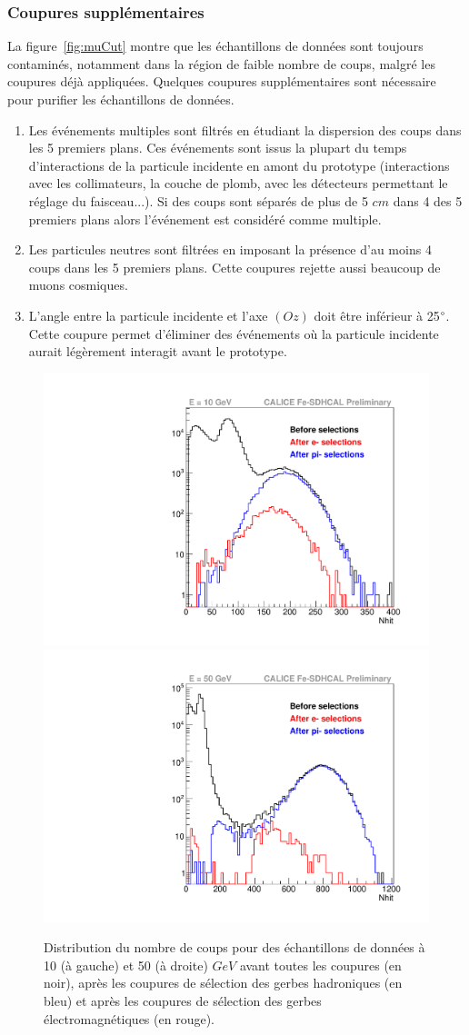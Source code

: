 \subsubsection{Coupures supplémentaires}
La figure~\ref{fig:muCut} montre que les échantillons de données sont toujours contaminés, notamment dans la région de faible nombre de coups, malgré les coupures déjà appliquées. Quelques coupures supplémentaires sont nécessaire pour purifier les échantillons de données. 
\begin{enumerate}[-]
\item Les événements multiples sont filtrés en étudiant la dispersion des coups dans les 5 premiers plans. Ces événements sont issus la plupart du temps d’interactions de la particule incidente en amont du prototype (interactions avec les collimateurs, la couche de plomb, avec les détecteurs permettant le réglage du faisceau...). Si des coups sont séparés de plus de 5 $cm$ dans 4 des 5 premiers plans alors l'événement est considéré comme multiple. 
\item Les particules neutres sont filtrées en imposant la présence d'au moins 4 coups dans les 5 premiers plans. Cette coupures rejette aussi beaucoup de muons cosmiques.
\item L'angle entre la particule incidente et l'axe $(Oz)$ doit être inférieur à 25$\degree$. Cette coupure permet d'éliminer des événements où la particule incidente aurait légèrement interagit avant le prototype.
\end{enumerate}
\label{sec.shower_selection}
\begin{figure}[!h]
  \begin{center}
    \includegraphics[width=.45\textwidth]{SDHCAL/figs/selection715693.pdf}
    \includegraphics[width=.45\textwidth]{SDHCAL/figs/selection715751.pdf}
    \caption{Distribution du nombre de coups pour des échantillons de données à 10 (à gauche) et 50 (à droite) $GeV$ avant toutes les coupures (en noir), après les coupures de sélection des gerbes hadroniques (en bleu) et après les coupures de sélection des gerbes électromagnétiques (en rouge).}
    \label{fig:pion_selection}
  \end{center}
\end{figure}
